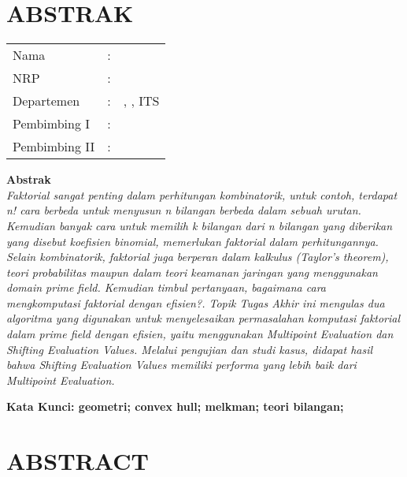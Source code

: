 \chapter {ABSTRAK}


\noindent\textbf{\MakeUppercase\judul}
\vspace*{1em}

\begin{tabularx}{\linewidth}{ l l p{2.2in} }
	Nama 			& : & \penulis \\
	NRP 			& :	& \nrp \\
	Departemen 		& : & \jurusan, \newline \fakultas, ITS \\
	Pembimbing I 	& : & \pembimbingsatu \\
	Pembimbing II 	& : & \pembimbingdua
	\vspace*{1em} 	%
\end {tabularx}

\noindent\textbf{Abstrak} \\
\itshape
Faktorial sangat penting dalam perhitungan kombinatorik, untuk contoh, terdapat n! cara berbeda untuk menyusun n bilangan berbeda dalam sebuah urutan. Kemudian banyak cara untuk memilih k bilangan dari n bilangan yang diberikan yang disebut koefisien binomial, memerlukan faktorial dalam perhitungannya. Selain kombinatorik, faktorial juga berperan dalam kalkulus (Taylor’s theorem), teori probabilitas maupun dalam teori keamanan jaringan yang menggunakan domain prime field. Kemudian timbul pertanyaan, bagaimana cara mengkomputasi faktorial dengan efisien?. Topik Tugas Akhir ini mengulas dua algoritma yang digunakan untuk menyelesaikan permasalahan komputasi faktorial dalam prime field dengan efisien, yaitu menggunakan Multipoint Evaluation dan Shifting Evaluation Values. Melalui pengujian dan studi kasus, didapat hasil bahwa Shifting Evaluation Values memiliki performa yang lebih baik dari Multipoint Evaluation.

\vspace*{1em}
\noindent\bfseries Kata Kunci: geometri; convex hull; melkman; teori bilangan;
\normalfont
\cleardoublepage

\chapter {ABSTRACT}
\noindent\textbf{\MakeUppercase\juduleng}
\vspace*{1em}

